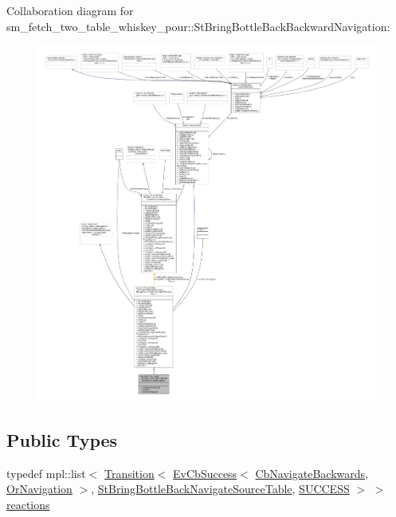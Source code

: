 Collaboration diagram for sm\+\_\+fetch\+\_\+two\+\_\+table\+\_\+whiskey\+\_\+pour\+:\+:St\+Bring\+Bottle\+Back\+Backward\+Navigation\+:
\nopagebreak
\begin{figure}[H]
\begin{center}
\leavevmode
\includegraphics[width=350pt]{structsm__fetch__two__table__whiskey__pour_1_1StBringBottleBackBackwardNavigation__coll__graph}
\end{center}
\end{figure}
\subsection*{Public Types}
\begin{DoxyCompactItemize}
\item 
typedef mpl\+::list$<$ \hyperlink{classsmacc_1_1Transition}{Transition}$<$ \hyperlink{structsmacc_1_1EvCbSuccess}{Ev\+Cb\+Success}$<$ \hyperlink{classcl__move__base__z_1_1CbNavigateBackwards}{Cb\+Navigate\+Backwards}, \hyperlink{classsm__fetch__two__table__whiskey__pour_1_1OrNavigation}{Or\+Navigation} $>$, \hyperlink{structsm__fetch__two__table__whiskey__pour_1_1StBringBottleBackNavigateSourceTable}{St\+Bring\+Bottle\+Back\+Navigate\+Source\+Table}, \hyperlink{structsmacc_1_1default__transition__tags_1_1SUCCESS}{S\+U\+C\+C\+E\+SS} $>$ $>$ \hyperlink{structsm__fetch__two__table__whiskey__pour_1_1StBringBottleBackBackwardNavigation_a118215821ee45042294132d540dfbaa0}{reactions}
\end{DoxyCompactItemize}
